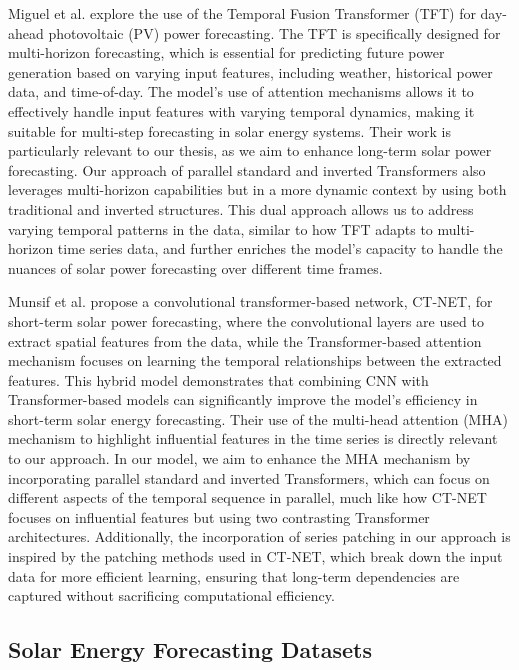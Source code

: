 \documentclass[12pt]{uomthesis}
\begin{document}
Miguel et al. \cite{lopezsantos2022temporalfusion} explore the use of the Temporal Fusion Transformer (TFT) for day-ahead photovoltaic (PV) power forecasting. The TFT is specifically designed for multi-horizon forecasting, which is essential for predicting future power generation based on varying input features, including weather, historical power data, and time-of-day. The model’s use of attention mechanisms allows it to effectively handle input features with varying temporal dynamics, making it suitable for multi-step forecasting in solar energy systems. Their work is particularly relevant to our thesis, as we aim to enhance long-term solar power forecasting. Our approach of parallel standard and inverted Transformers also leverages multi-horizon capabilities but in a more dynamic context by using both traditional and inverted structures. This dual approach allows us to address varying temporal patterns in the data, similar to how TFT adapts to multi-horizon time series data, and further enriches the model’s capacity to handle the nuances of solar power forecasting over different time frames.

Munsif et al. \cite{munsif2023ctnet} propose a convolutional transformer-based network, CT-NET, for short-term solar power forecasting, where the convolutional layers are used to extract spatial features from the data, while the Transformer-based attention mechanism focuses on learning the temporal relationships between the extracted features. This hybrid model demonstrates that combining CNN with Transformer-based models can significantly improve the model’s efficiency in short-term solar energy forecasting. Their use of the multi-head attention (MHA) mechanism to highlight influential features in the time series is directly relevant to our approach. In our model, we aim to enhance the MHA mechanism by incorporating parallel standard and inverted Transformers, which can focus on different aspects of the temporal sequence in parallel, much like how CT-NET focuses on influential features but using two contrasting Transformer architectures. Additionally, the incorporation of series patching in our approach is inspired by the patching methods used in CT-NET, which break down the input data for more efficient learning, ensuring that long-term dependencies are captured without sacrificing computational efficiency.


\subsection{Solar Energy Forecasting Datasets}
\end{document}
